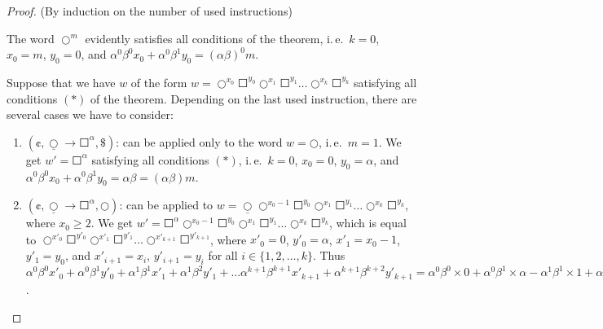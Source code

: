 \begin{proof}
(By induction on the number of used instructions)

The word $\Circle^m$ evidently
satisfies all conditions of the theorem, i.\,e.\ $k = 0$, $x_0 = m$, $y_0 = 0$, and
$\alpha^0 \beta^0 x_0 + \alpha^0 \beta^1 y_0 = (\alpha \beta)^0 m$.

Suppose that we have $w$ of the form
$w = \Circle^{x_0} \Square^{y_0} \Circle^{x_1} \Square^{y_1} \ldots \Circle^{x_k} \Square^{y_k}$
satisfying all conditions $(*)$ of the theorem.
Depending on the last used instruction, there are several cases we have to consider:

\begin{enumerate}
\item $(\cent, \underline{\Circle} \to \Square^{\alpha}, \$)$:
can be applied only to the word $w = \Circle$, i.\,e.\ $m = 1$. We get $w' = \Square^{\alpha}$ satisfying all conditions $(*)$, i.\,e.\ $k = 0$, $x_0 = 0$, $y_0 = \alpha$, and $\alpha^0 \beta^0 x_0 + \alpha^0 \beta^1 y_0 = \alpha \beta = (\alpha \beta) m$.

\item $(\cent, \underline{\Circle} \to \Square^{\alpha}, \Circle)$:
can be applied to $w = \underline{\Circle} \Circle^{x_0 - 1} \Square^{y_0} \Circle^{x_1} \Square^{y_1} \ldots \Circle^{x_k} \Square^{y_k}$, where $x_0 \ge 2$. We get $w' = \Square^{\alpha} \Circle^{x_0 - 1} \Square^{y_0} \Circle^{x_1} \Square^{y_1} \ldots \Circle^{x_k} \Square^{y_k}$, which is equal to $\Circle^{x'_0} \Square^{y'_0} \Circle^{x'_1} \Square^{y'_1} \ldots \Circle^{x'_{k+1}} \Square^{y'_{k+1}}$, where $x'_0 = 0$, $y'_0 = \alpha$, $x'_1 = x_0 - 1$, $y'_1 = y_0$, and $x'_{i+1} = x_i$, $y'_{i+1} = y_i$ for all $i \in \{1, 2, \ldots, k\}$. Thus $\alpha^0 \beta^0 x'_0 + \alpha^0 \beta^1 y'_0 + \alpha^1 \beta^1 x'_1 + \alpha^1 \beta^2 y'_1 + \ldots \alpha^{k+1} \beta^{k+1} x'_{k+1} + \alpha^{k+1} \beta^{k+2} y'_{k+1} = \alpha^0 \beta^0 \times 0 + \alpha^0 \beta^1 \times \alpha - \alpha^1 \beta^1 \times 1 + \alpha^1 \beta^1 (\alpha^0 \beta^0 x_0 + \alpha^0 \beta^1 y_0 + \ldots \alpha^k \beta^k x_k + \alpha^k \beta^{k+1} y_k) = (\alpha \beta) \times (\alpha \beta)^l m = (\alpha \beta)^{l+1} m$.


\end{enumerate}
\end{proof}
